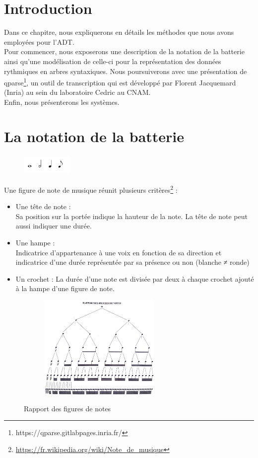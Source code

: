 \section*{Introduction}
Dans ce chapitre, nous expliquerons en détails les méthodes que nous avons employées pour l’ADT.\\
Pour commencer, nous exposerons une description de la notation de la batterie ainsi qu’une modélisation de celle-ci pour la représentation des données rythmiques en arbres syntaxiques. Nous poursuiverons avec une présentation de qparse\footnote{https://qparse.gitlabpages.inria.fr/}, un outil de transcription qui est développé par Florent Jacquemard (Inria) au sein du laboratoire Cedric au CNAM.\\
Enfin, nous présenterons les systèmes. 
\section{La notation de la batterie}
\begin{figure}[h]
	\centering
	\includegraphics[height=10mm, width=25mm]{z_images/3_methodes/0_notation_de_la_batterie/0_figures_de_notes.png}
\end{figure}
Une figure de note \cite{danhauser} de musique réunit plusieurs critères\footnote{\url{https://fr.wikipedia.org/wiki/Note_de_musique}} :
\begin{itemize}
	\item Une tête de note :\\
	Sa position sur la portée indique la hauteur de la note. La tête de note peut aussi indiquer une durée.
	\item Une hampe :\\
	Indicatrice d’appartenance à une voix en fonction de sa direction et indicatrice d’une durée représentée par sa présence ou non (blanche ≠ ronde)
	\item Un crochet : La durée d’une note est divisée par deux à chaque crochet ajouté à la hampe d’une figure de note.
\end{itemize}
\begin{figure}[h]
	\centering
	\includegraphics[height=50mm, width=80mm]{z_images/3_methodes/0_notation_de_la_batterie/1_rapport_figures_notes.png}
	\caption{Rapport des figures de notes}\cite{danhauser}
	\label{rapp_fig_notes}
\end{figure}
